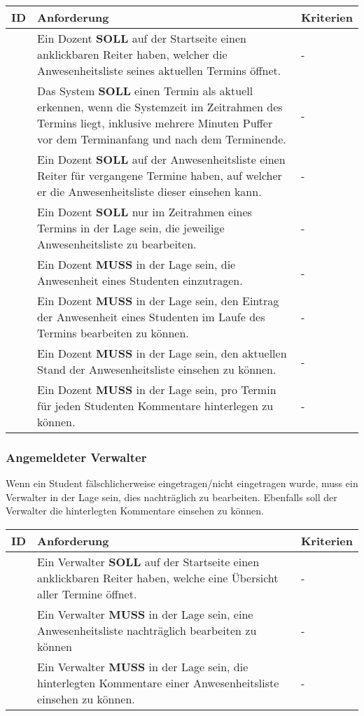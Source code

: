 \begin{tabular} {|p{}|p{}|p{}|}
	\hline
	ID & Anforderung & Kriterien \\
	\hline
	\printfreqnr
	& Ein Dozent \textbf{SOLL} auf der Startseite einen anklickbaren Reiter haben, welcher die Anwesenheitsliste seines aktuellen Termins öffnet.
	& - \\
	\hline
	\printfreqnr
	& Das System \textbf{SOLL} einen Termin als aktuell erkennen, wenn die Systemzeit im Zeitrahmen des Termins liegt, inklusive mehrere Minuten Puffer vor dem Terminanfang und nach dem Terminende.
	& - \\
	\hline
	\printfreqnr
	& Ein Dozent \textbf{SOLL} auf der Anwesenheitsliste einen Reiter für vergangene Termine haben, auf welcher er die Anwesenheitsliste dieser einsehen kann.
	& - \\
	\hline
	\printfreqnr
	& Ein Dozent \textbf{SOLL} nur im Zeitrahmen eines Termins in der Lage sein, die jeweilige Anwesenheitsliste zu bearbeiten.
	& - \\
	\hline
	\printfreqnr
	& Ein Dozent \textbf{MUSS} in der Lage sein, die Anwesenheit eines Studenten einzutragen.
	& - \\
	\hline
	\printfreqnr
	& Ein Dozent \textbf{MUSS} in der Lage sein, den Eintrag der Anwesenheit eines Studenten im Laufe des Termins bearbeiten zu können. 
	& - \\
	\hline
	\printfreqnr
	& Ein Dozent \textbf{MUSS} in der Lage sein, den aktuellen Stand der Anwesenheitsliste einsehen zu können.
	& - \\
	\hline
	\printfreqnr
	& Ein Dozent \textbf{MUSS} in der Lage sein, pro Termin für jeden Studenten Kommentare hinterlegen zu können.
	& - \\
	\hline
\end{tabular}

\newpage

\subsubsection{Angemeldeter Verwalter}
Wenn ein Student fälschlicherweise eingetragen/nicht eingetragen wurde, muss ein Verwalter in der Lage sein, dies nachträglich zu bearbeiten. Ebenfalls soll der Verwalter die hinterlegten Kommentare einsehen zu können.
\vspace{12pt}

\begin{tabular} {|p{}|p{}|p{}|}
	\hline
	ID & Anforderung & Kriterien \\
	\hline
	\printfreqnr
	& Ein Verwalter \textbf{SOLL} auf der Startseite einen anklickbaren Reiter haben, welche eine Übersicht aller Termine öffnet.
	& - \\
	\hline
	\printfreqnr
	& Ein Verwalter \textbf{MUSS} in der Lage sein, eine Anwesenheitsliste nachträglich bearbeiten zu können
	& - \\
	\hline
	\printfreqnr
	& Ein Verwalter \textbf{MUSS} in der Lage sein, die hinterlegten Kommentare einer Anwesenheitsliste einsehen zu können.
	& - \\
	\hline
\end{tabular}

